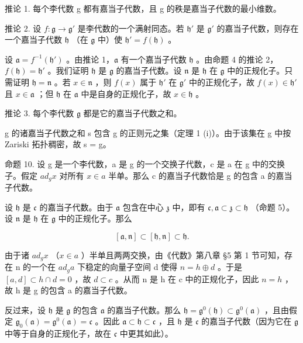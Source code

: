 推论 1. 每个李代数 g 都有嘉当子代数，且 g 的秩是嘉当子代数的最小维数。

推论 2. 设 \(f: \mathfrak{g} \to \mathfrak{g}'\) 是李代数的一个满射同态。若 \(\mathfrak{h}'\) 是 \(\mathfrak{g}'\) 的嘉当子代数，则存在一个嘉当子代数 \(\mathfrak{h}\) （在 \(\mathfrak{g}\) 中）使 \(\mathfrak{h}' = f(\mathfrak{h})\) 。

设 \(\mathfrak{a} = f^{-1}(\mathfrak{h}')\) 。由推论 1，\(\mathfrak{a}\) 有一个嘉当子代数 \(\mathfrak{h}\) 。由命题 4 的推论 2，\(f(\mathfrak{h}) = \mathfrak{h}'\) 。我们证明 \(\mathfrak{h}\) 是 \(\mathfrak{g}\) 的嘉当子代数。设 \(\mathfrak{n}\) 是 \(\mathfrak{h}\) 在 \(\mathfrak{g}\) 中的正规化子。只需证明 \(\mathfrak{h} = \mathfrak{n}\) 。若 \(x \in \mathfrak{n}\) ，则 \(f(x)\) 属于 \(\mathfrak{h}'\) 在 \(\mathfrak{g}'\) 中的正规化子，故 \(f(x) \in \mathfrak{h}'\) 且 \(x \in \mathfrak{a}\) ；但 \(\mathfrak{h}\) 在 \(\mathfrak{a}\) 中是自身的正规化子，故 \(x \in \mathfrak{h}\) 。

推论 3. 每个李代数 \(\mathfrak{g}\) 都是它的嘉当子代数之和。

g 的诸嘉当子代数之和 s 包含 g 的正则元之集（定理 1 (i)）。由于该集在 g 中按 Zariski 拓扑稠密，故 s = g。

命题 10. 设 g 是一个李代数，a 是 g 的一个交换子代数，c 是 a 在 g 中的交换子。假定 \(ad_{g}x\) 对所有 \(x \in a\) 半单。那么 c 的嘉当子代数恰是 g 的包含 a 的嘉当子代数。

设 \(\mathfrak{h}\) 是 \(\mathfrak{c}\) 的嘉当子代数。由于 \(\mathfrak{a}\) 包含在中心 \(\mathfrak{z}\) 中，即有 \(\mathfrak{c}, \mathfrak{a} \subset \mathfrak{z} \subset \mathfrak{h}\) （命题 5）。设 \(\mathfrak{n}\) 是 \(\mathfrak{h}\) 在 \(\mathfrak{g}\) 中的正规化子。那么

\[
[ \mathfrak {a}, \mathfrak {n} ] \subset [ \mathfrak {h}, \mathfrak {n} ] \subset \mathfrak {h}.
\]

由于诸 \(ad_{g}x\) （\(x \in a\) ）半单且两两交换，由《代数》第八章 §5 第 1 节可知，存在 n 的一个在 \(ad_{g}a\) 下稳定的向量子空间 d 使得 \(n = h \oplus d\) 。于是 \([a, d] \subset h \cap d = 0\) ，故 \(d \subset c\) 。从而 n 是 h 在 c 中的正规化子，因此 \(n = h\) ，故 h 是 g 的包含 a 的嘉当子代数。

反过来，设 \(\mathfrak{h}\) 是 \(\mathfrak{g}\) 的包含 \(\mathfrak{a}\) 的嘉当子代数。那么 \(\mathfrak{h} = \mathfrak{g}^0 (\mathfrak{h})\subset \mathfrak{g}^0 (\mathfrak{a})\) ，且由假定 \(\mathfrak{g}_0(\mathfrak{a}) = \mathfrak{g}^0 (\mathfrak{a}) = \mathfrak{c}\) 。因此 \(\mathfrak{a}\subset \mathfrak{h}\subset \mathfrak{c}\) ，且 \(\mathfrak{h}\) 是 \(\mathfrak{c}\) 的嘉当子代数（因为它在 \(\mathfrak{g}\) 中等于自身的正规化子，故在 \(\mathfrak{c}\) 中更其如此）。

